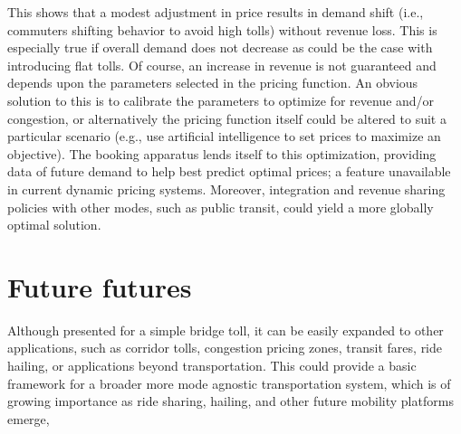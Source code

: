 \documentclass[10pt, letter, twocolumn]{article} %
\begin{document}
This shows that a modest adjustment in price results in demand shift (i.e., commuters shifting behavior to avoid high tolls) without revenue loss. This is especially true if overall demand does not decrease as could be the case with introducing flat tolls. Of course, an increase in revenue is not guaranteed and depends upon the parameters selected in the pricing function. An obvious solution to this is to calibrate the parameters to optimize for revenue and/or congestion, or alternatively the pricing function itself could be altered to suit a particular scenario (e.g., use artificial intelligence to set prices to maximize an objective). The booking apparatus lends itself to this optimization, providing data of future demand to help best predict optimal prices; a feature unavailable in current dynamic pricing systems. Moreover, integration and revenue sharing policies with other modes, such as public transit, could yield a more globally optimal solution. 

\section{Future futures}
Although presented for a simple bridge toll, it can be easily expanded to other applications, such as corridor tolls, congestion pricing zones, transit fares, ride hailing, or applications beyond transportation. This could provide a basic framework for a broader more mode agnostic transportation system, which is of growing importance as ride sharing, hailing, and other future mobility platforms emerge, 
\end{document}
